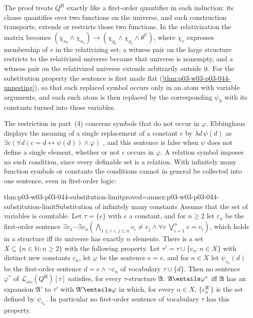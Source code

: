 The proof treats \(Q^{\mathrm H}\) exactly like a first-order quantifier in
each induction: its clause quantifies over two functions on the universe,
and each construction transports, extends or restricts those two functions.
In the relativization the matrix becomes
\((\chi_{x_0}\land\chi_{x_1})\to(\chi_{y_0}\land\chi_{y_1}\land\theta^U)\),
where \(\chi_v\) expresses membership of \(v\) in the relativizing set; a
witness pair on the large structure restricts to the relativized universe
because that universe is nonempty, and a witness pair on the relativized
universe extends arbitrarily outside it.  For the substitution property the
sentence is first made flat (\cref{thm:p03-w03-p03-044-unnesting}), so that
each replaced symbol occurs only in an atom with variable arguments, and each
such atom is then replaced by the corresponding \(\psi_S\) with its constants
turned into those variables.

The restriction in part~(4) concerns symbols that do not occur in
\(\varphi\).  Ebbinghaus displays the meaning of a single replacement of a
constant \(c\) by \(\lambda d\,\psi(d)\) as
\(\exists c(\forall d(c=d\leftrightarrow\psi(d))\land\varphi)\)
\cite[Ch.~II, p.~30]{Ebbinghaus1985ExtendedLogics}, and this sentence is
false when \(\psi\) does not define a single element, whether or not \(c\)
occurs in \(\varphi\).  A relation symbol imposes no such condition, since
every definable set is a relation.  With infinitely many function symbols or
constants the conditions cannot in general be collected into one sentence,
even in first-order logic:

\begin{hbtheorem}{thm:p03-w03-p03-044-substitution-limit}{proved=annex:p03-w03-p03-044-substitution-limit}{Substitution of infinitely many constants}
Assume that the set of variables is countable.  Let \(\tau=\{e\}\) with
\(e\) a constant, and for \(n\ge2\) let \(\varepsilon_n\) be the
first-order sentence
\(\exists v_1\cdots\exists v_n(\bigwedge_{1\le i<j\le n}v_i\neq v_j\land
\forall v\,\bigvee_{i=1}^n v=v_i)\), which holds in a structure iff its
universe has exactly \(n\) elements.  There is a set
\(X\subseteq\{n\in\mathbb N:n\ge2\}\) with the following property.  Let
\(\tau'=\tau\cup\{c_n:n\in X\}\) with distinct new constants \(c_n\), let
\(\varphi\) be the sentence \(e=e\), and for \(n\in X\) let
\(\psi_{c_n}(d)\) be the first-order sentence \(d=e\land\neg\varepsilon_n\)
of vocabulary \(\tau\cup\{d\}\).  Then no sentence \(\varphi^\ast\) of
\(\mathscr L_{\omega\omega}(Q^{\mathrm H})[\tau]\) satisfies, for every
\(\tau\)-structure \(\mathfrak A\):
\(\mathfrak A\entails\varphi^\ast\) iff \(\mathfrak A\) has an expansion
\(\mathfrak A'\) to \(\tau'\) with \(\mathfrak A'\entails\varphi\) in which,
for every \(n\in X\), \(\{c_n^{\mathfrak A'}\}\) is the set defined by
\(\psi_{c_n}\).  In particular no first-order sentence of vocabulary
\(\tau\) has this property.
\end{hbtheorem}

